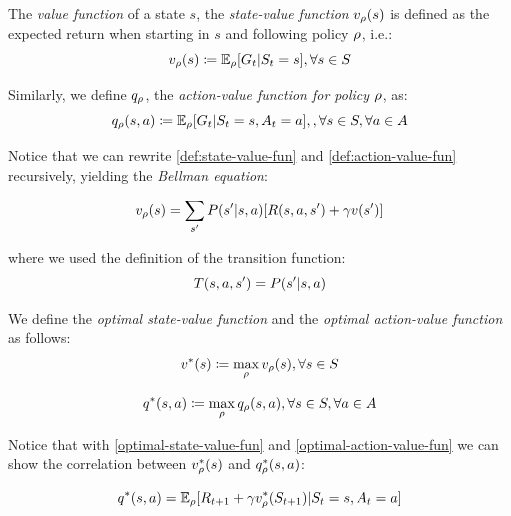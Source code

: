 The \emph{value function} of a state $s$, the \emph{state-value function} $v_\rho(s)$ is defined as the expected return when starting in $s$ and following policy $\rho$, i.e.:
\begin{equation}
\label{def:state-value-fun}
v_\rho(s) \coloneqq \mathbb{E}_{\rho}[G_t | S_t = s], \forall s \in S
\end{equation}

Similarly, we define $q_\rho$, the \emph{action-value function for policy $\rho$}, as:
\begin{equation}
\label{def:action-value-fun}
q_\rho(s, a) \coloneqq \mathbb{E}_{\rho}[G_t | S_t = s, A_t = a], , \forall s \in S, \forall a \in A
\end{equation}

Notice that we can rewrite \ref{def:state-value-fun} and \ref{def:action-value-fun} recursively, yielding the \emph{Bellman equation}:

\begin{equation}
\label{def:bellman-state-value-fun}
v_\rho(s) =  \sum_{s'} P(s' | s,a)[R(s,a,s') + \gamma v(s')] 
\end{equation}

where we used the definition of the transition function:
\begin{equation}
T(s,a,s') = P(s' | s,a)
\end{equation}

We define the \emph{optimal state-value function} and the \emph{optimal action-value function} as follows:
\begin{equation}
\label{optimal-state-value-fun}
v^*(s)  \coloneqq \max_\rho  v_\rho(s), \forall s\in S		
\end{equation}

\begin{equation}
\label{optimal-action-value-fun}
q^*(s, a) \coloneqq \max_\rho  q_\rho(s, a), \forall s\in S, \forall a\in A
\end{equation}

Notice that with \ref{optimal-state-value-fun} and \ref{optimal-action-value-fun} we can show the correlation between $v^*_\rho(s)$ and $q^*_\rho(s, a)$:

\begin{equation}
q^*(s, a) = \mathbb{E}_\rho[R_{t+1} + \gamma v^*_\rho(S_{t+1})| S_t = s, A_t = a]
\end{equation}


